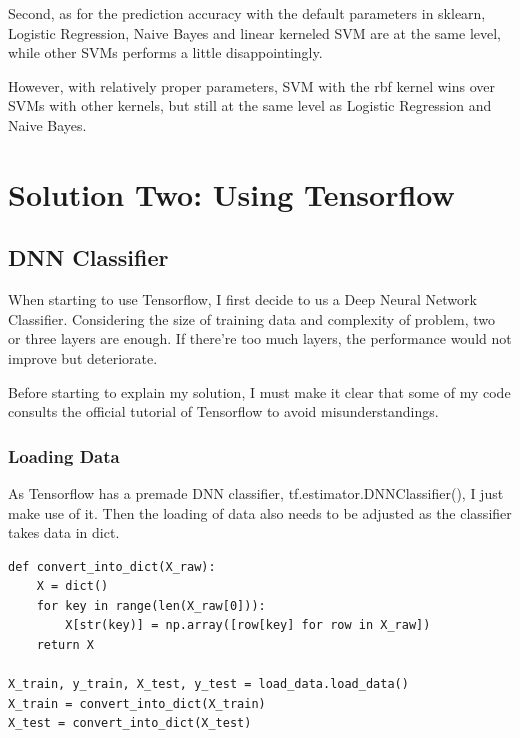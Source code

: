 \documentclass[a4paper]{article}
\begin{document}
Second, as for the prediction accuracy with the default parameters in sklearn, Logistic Regression, Naive Bayes and linear kerneled SVM are at the same level, while other SVMs performs a little disappointingly.

However, with relatively proper parameters, SVM with the rbf kernel wins over SVMs with other kernels, but still at the same level as Logistic Regression and Naive Bayes.

    \newpage
    \section{Solution Two: Using Tensorflow}
        \subsection{DNN Classifier}
When starting to use Tensorflow, I first decide to us a Deep Neural Network Classifier. Considering the size of training data and complexity of problem, two or three layers are enough. If there're too much layers, the performance would not improve but deteriorate.

Before starting to explain my solution, I must make it clear that some of my code consults the official tutorial of Tensorflow to avoid misunderstandings.

            \subsubsection{Loading Data}
As Tensorflow has a premade DNN classifier, tf.estimator.DNNClassifier(), I just make use of it. Then the loading of data also needs to be adjusted as the classifier takes data in dict.
\begin{verbatim}
def convert_into_dict(X_raw):
    X = dict()
    for key in range(len(X_raw[0])):
        X[str(key)] = np.array([row[key] for row in X_raw])
    return X

X_train, y_train, X_test, y_test = load_data.load_data()
X_train = convert_into_dict(X_train)
X_test = convert_into_dict(X_test)
\end{verbatim}
\end{document}
